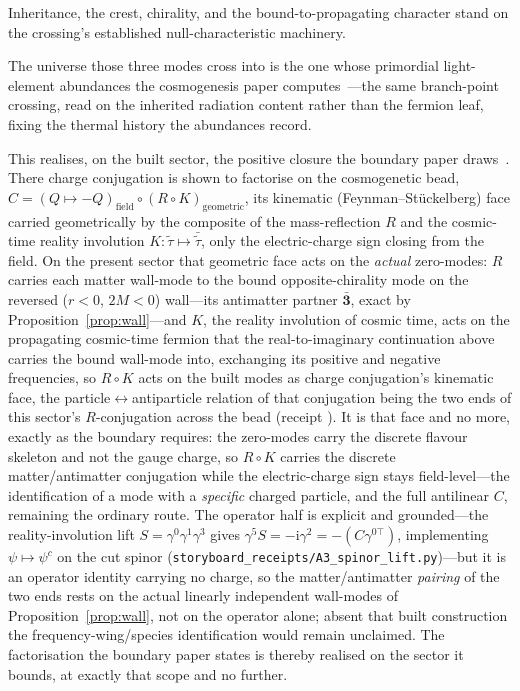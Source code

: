 \documentclass[11pt]{article}
\begin{document}
Inheritance, the crest, chirality, and the bound-to-propagating character stand on the crossing's established null-characteristic machinery. 

The universe those three modes cross into is the one whose primordial light-element abundances the cosmogenesis paper computes~\cite{JanzenCosmogenesis}---the same branch-point crossing, read on the inherited radiation content rather than the fermion leaf, fixing the thermal history the abundances record. 

This realises, on the built sector, the positive closure the boundary paper draws~\cite{JanzenBoundary}. There charge conjugation is shown to factorise on the cosmogenetic bead, $C=(Q\mapsto-Q)_{\mathrm{field}}\circ(R\circ K)_{\mathrm{geometric}}$, its kinematic (Feynman--St\"uckelberg) face carried geometrically by the composite of the mass-reflection $R$ and the cosmic-time reality involution $K:\tilde\tau\mapsto\bar{\tilde\tau}$, only the electric-charge sign closing from the field. On the present sector that geometric face acts on the \emph{actual} zero-modes: $R$ carries each matter wall-mode to the bound opposite-chirality mode on the reversed ($r<0$, $2M<0$) wall---its antimatter partner $\bar{\mathbf 3}$, exact by Proposition~\ref{prop:wall}---and $K$, the reality involution of cosmic time, acts on the propagating cosmic-time fermion that the real-to-imaginary continuation above carries the bound wall-mode into, exchanging its positive and negative frequencies, so $R\circ K$ acts on the built modes as charge conjugation's kinematic face, the particle$\leftrightarrow$antiparticle relation of that conjugation being the two ends of this sector's $R$-conjugation across the bead (receipt ). It is that face and no more, exactly as the boundary requires: the zero-modes carry the discrete flavour skeleton and not the gauge charge, so $R\circ K$ carries the discrete matter/antimatter conjugation while the electric-charge sign stays field-level---the identification of a mode with a \emph{specific} charged particle, and the full antilinear $C$, remaining the ordinary route. The operator half is explicit and grounded---the reality-involution lift $S=\gamma^{0}\gamma^{1}\gamma^{3}$ gives $\gamma^{5}S=-\mathrm{i}\gamma^{2}=-(C\gamma^{0\top})$, implementing $\psi\mapsto\psi^{c}$ on the cut spinor (\texttt{storyboard\_receipts/A3\_spinor\_lift.py})---but it is an operator identity carrying no charge, so the matter/antimatter \emph{pairing} of the two ends rests on the actual linearly independent wall-modes of Proposition~\ref{prop:wall}, not on the operator alone; absent that built construction the frequency-wing/species identification would
remain unclaimed. The factorisation the boundary paper states is thereby realised on the sector it bounds, at exactly that scope and no further.
\end{document}
